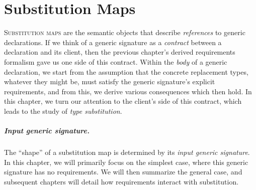 \documentclass[../generics]{subfiles}
\begin{document}
\chapter{Substitution Maps}\label{chap:substitution maps}

\lettrine{S}{ubstitution maps} are the semantic objects that describe \emph{references} to generic declarations. If we think of a generic signature as a \emph{contract} between a declaration and its client, then the previous chapter's derived requirements formalism gave us one side of this contract. Within the \emph{body} of a generic declaration, we start from the assumption that the concrete replacement types, whatever they might be, must satisfy the generic signature's explicit requirements, and from this, we derive various consequences which then hold. In this chapter, we turn our attention to the client's side of this contract, which leads to the study of \emph{type substitution}.

\paragraph{Input generic signature.}
The ``shape'' of a substitution map is determined by its \emph{input generic signature}. In this chapter, we will primarily focus on the simplest case, where this generic signature has no requirements. We will then summarize the general case, and subsequent chapters will detail how requirements interact with substitution.
\end{document}
